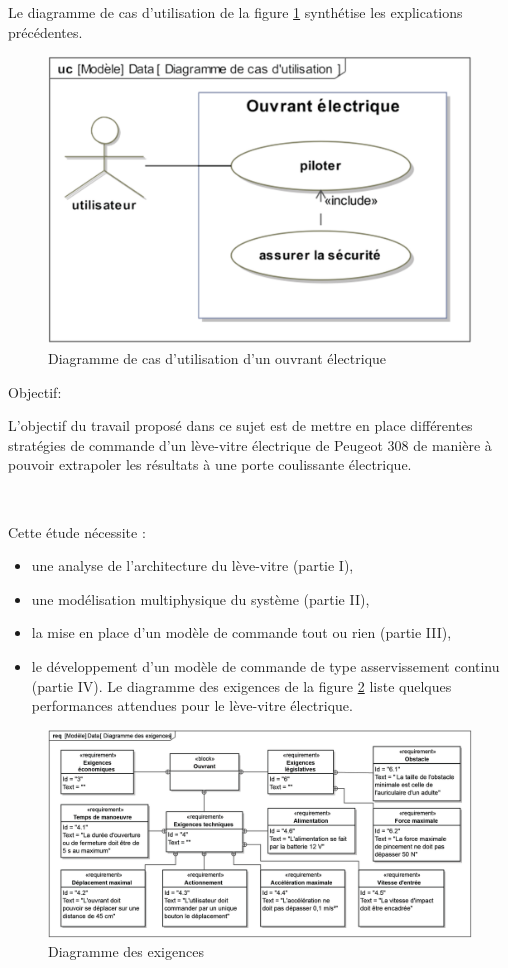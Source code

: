 Le diagramme de cas d'utilisation de la figure \ref{img02} synthétise les explications précédentes.

\newpage

\begin{figure}[!h]
 \centering\includegraphics[width=0.5\linewidth]{img/img02}
 \caption{Diagramme de cas d'utilisation d'un ouvrant électrique}
 \label{img02}
\end{figure}

Objectif:

L'objectif du travail proposé dans ce sujet est de mettre en place différentes stratégies de commande d'un lève-vitre électrique de Peugeot 308 de manière à pouvoir extrapoler les résultats à une porte coulissante électrique.

~\

Cette étude nécessite :
\begin{itemize}
 \item une analyse de l'architecture du lève-vitre (partie I),
 \item une modélisation multiphysique du système (partie II),
 \item la mise en place d'un modèle de commande tout ou rien (partie III),
 \item le développement d'un modèle de commande de type asservissement continu (partie IV). Le diagramme des exigences de la figure \ref{img03} liste quelques performances attendues pour le lève-vitre électrique.
\end{itemize}

\begin{figure}[!h]
 \centering\includegraphics[width=0.9\linewidth]{img/img03}
 \caption{Diagramme des exigences}
 \label{img03}
\end{figure}


